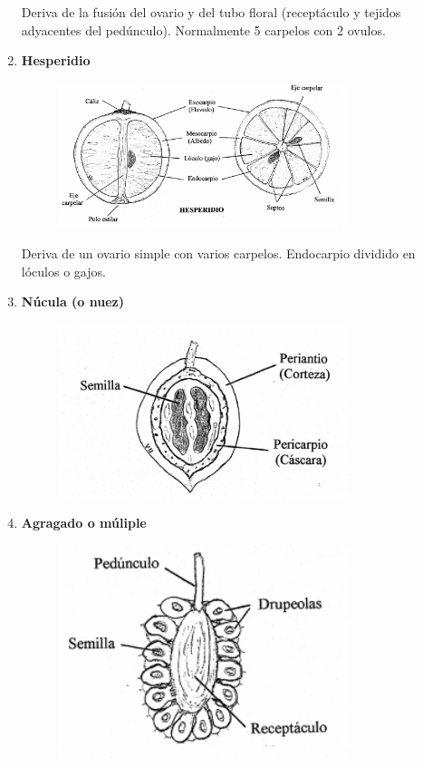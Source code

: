 \documentclass[a4paper,12pt,oneside]{book}
\begin{document}
\begin{enumerate}
Deriva de la fusión del ovario y del tubo floral (receptáculo y tejidos
adyacentes del pedúnculo). Normalmente 5 carpelos con 2 ovulos.  
\vspace{3cm}
\item \textbf{Hesperidio}
\label{sec:orga9282c8}

\begin{figure}[htbp]
\centering
\includegraphics[width=0.8\textwidth]{./img_1481/hesperidio.PNG}
\caption{}
\end{figure}

Deriva de un ovario simple con varios carpelos. Endocarpio dividido en lóculos o
gajos.
\newpage
\item \textbf{Núcula (o nuez)}
\label{sec:org6a8bd6f}

\begin{figure}[htbp]
\centering
\includegraphics[width=0.8\textwidth]{./img_1481/nucula.PNG}
\caption{}
\end{figure}

\item \textbf{Agragado o múliple}
\label{sec:org0f23a78}

\begin{figure}[htbp]
\centering
\includegraphics[width=0.8\textwidth]{./img_1481/polidrupa.PNG}
\caption{}
\end{figure}


\end{enumerate}
\end{document}
